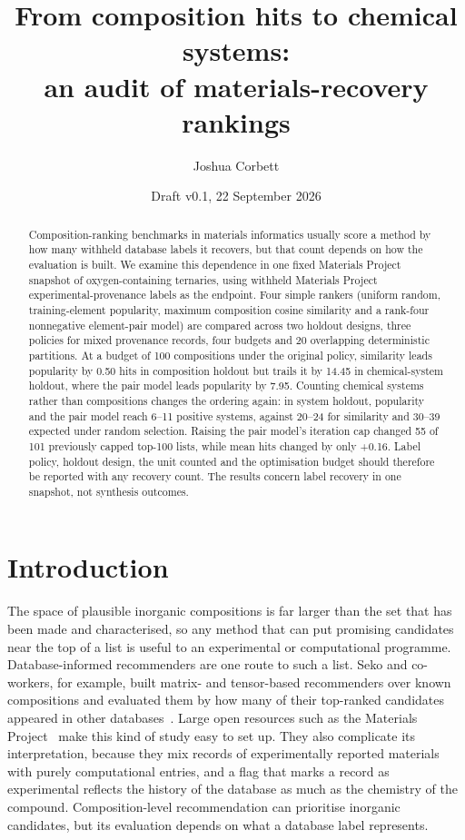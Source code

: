 \documentclass[11pt,a4paper]{article}
\title{From composition hits to chemical systems:\\ an audit of materials-recovery rankings}
\author{Joshua Corbett\authornote{affiliation, ORCID and correspondence address to add}}
\date{Draft v0.1, 22 September 2026}
\begin{document}
\maketitle

\begin{abstract}
Composition-ranking benchmarks in materials informatics usually score a method by how many withheld database labels it recovers, but that count depends on how the evaluation is built. We examine this dependence in one fixed Materials Project snapshot of oxygen-containing ternaries, using withheld Materials Project experimental-provenance labels as the endpoint. Four simple rankers (uniform random, training-element popularity, maximum composition cosine similarity and a rank-four nonnegative element-pair model) are compared across two holdout designs, three policies for mixed provenance records, four budgets and 20 overlapping deterministic partitions. At a budget of 100 compositions under the original policy, similarity leads popularity by 0.50 hits in composition holdout but trails it by 14.45 in chemical-system holdout, where the pair model leads popularity by 7.95. Counting chemical systems rather than compositions changes the ordering again: in system holdout, popularity and the pair model reach 6--11 positive systems, against 20--24 for similarity and 30--39 expected under random selection. Raising the pair model's iteration cap changed 55 of 101 previously capped top-100 lists, while mean hits changed by only +0.16. Label policy, holdout design, the unit counted and the optimisation budget should therefore be reported with any recovery count. The results concern label recovery in one snapshot, not synthesis outcomes.
\end{abstract}

\section{Introduction}

The space of plausible inorganic compositions is far larger than the set that has been made and characterised, so any method that can put promising candidates near the top of a list is useful to an experimental or computational programme. Database-informed recommenders are one route to such a list. Seko and co-workers, for example, built matrix- and tensor-based recommenders over known compositions and evaluated them by how many of their top-ranked candidates appeared in other databases~\citep{seko2018,hayashi2022}. Large open resources such as the Materials Project~\citep{jain2013} make this kind of study easy to set up. They also complicate its interpretation, because they mix records of experimentally reported materials with purely computational entries, and a flag that marks a record as experimental reflects the history of the database as much as the chemistry of the compound. Composition-level recommendation can prioritise inorganic candidates, but its evaluation depends on what a database label represents.
\end{document}
